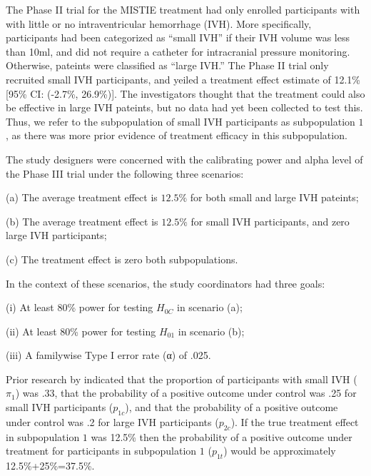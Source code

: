 \documentclass[article]{jss}
\begin{document}
The Phase II trial for the MISTIE treatment had only enrolled participants with with little or no intraventricular hemorrhage (IVH). More specifically, participants had been categorized as ``small IVH'' if their IVH volume was less than 10ml, and did not require a catheter for intracranial pressure monitoring. Otherwise, pateints were classified as ``large IVH.'' The Phase II trial only recruited small IVH participants, and yeiled a treatment effect estimate of 12.1\% [95\% CI: (-2.7\%, 26.9\%)]. The investigators thought that the treatment could also be effective in large IVH pateints, but no data had yet been collected to test this. Thus, we refer to the subpopulation of small IVH participants as subpopulation $1$, as there was more prior evidence of treatment efficacy in this subpopulation.

The study designers were concerned with the calibrating power and alpha level of the Phase III trial under the following three scenarios:


\begin{description}
\item  (a) The average treatment effect is $12.5\%$ for both small and large IVH pateints;
\item  (b) The average treatment effect is $12.5\%$ for small IVH participants, and zero large IVH participants;
\item  (c) The treatment effect is zero both subpopulations. 
\end{description}

In the context of these scenarios, the study coordinators had three goals:

\begin{description}
\item  (i) At least 80\% power for testing $H_{0C}$ in scenario (a);
\item  (ii) At least 80\% power for testing $H_{01}$ in scenario (b);
\item  (iii) A familywise Type I error rate (α) of .025.
\end{description}

Prior research by \cite{Hanley2012} indicated that the proportion of participants with small IVH ($π_1$) was .33, that the probability of a positive outcome under control was .25 for small IVH participants ($p_{1c}$), and that the probability of a positive outcome under control was .2 for large IVH participants ($p_{2c}$).  If the true treatment effect in subpopulation $1$ was 12.5\% then the probability of a positive outcome under treatment for participants in subpopulation $1$ ($p_{1t}$) would be approximately 12.5\%+25\%=37.5\%.
\end{document}
